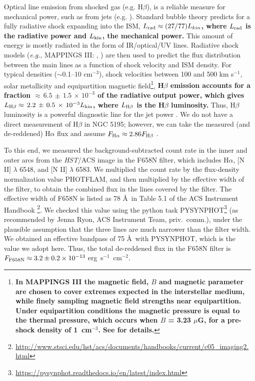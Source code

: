 \documentclass[fleqn,usenatbib]{mnras}
\begin{document}
Optical line emission from shocked gas (e.g. H$\beta$), is a reliable measure for mechanical power, 
such as from jets (e.g. \citealt{DopitaSutherland1996,Allenetal2008}). Standard bubble theory \citep{Weaver+1977} predicts for a fully radiative shock expanding into the ISM, \textbf{$L_{\rm rad} \approx (27/77)L_{kin}$, where  $L_{\rm rad}$ is the radiative power and $L_{\rm kin}$, the mechanical power.}
This amount of energy is mostly radiated in the form of IR/optical/UV lines. Radiative shock models ({\it e.g.}, 
{\small {MAPPINGS III}}: \citealt{DopitaSutherland1996}, \citealt{Allenetal2008}) are then used to 
predict the flux distribution between the main lines as a function of shock velocity and ISM density. 
For typical densities ($\sim$0.1--10 cm$^{-3}$), shock velocities between 100 and 500 km s$^{-1}$, 
solar metallicity and equipartition magnetic field\footnote{\textbf{In MAPPINGS III the magnetic field, $B$ and magnetic parameter are chosen to cover extremes expected in the interstellar medium, 
while finely sampling magnetic field strengths near equipartition. Under equipartition conditions the magnetic 
pressure is equal to the thermal pressure, which occurs when $B$ = 3.23 $\mu$G, for a pre-shock 
density of 1~cm$^{-3}$. See \citealt{Allenetal2008} for details.}}, \textbf{H$\beta$ emission accounts for a 
fraction $\approx\, 6.5\, \pm\, 1.5\, \times\, 10^{-3}$ of the radiative output power, which gives  $L_{\rm{H}\beta} \approx\, 2.2\, \pm\, 0.5\, \times\, 10^{-3} L_{\rm kin}$, where $L_{\rm{H}\beta}$ is the H$\beta$ luminosity.} Thus, H$\beta$ luminosity is a powerful diagnostic line for the 
jet power \citep{Pakull+2010}. We do not have a direct measurement of H$\beta$ in NGC 5195; however, 
we can take the measured (and de-reddened) H$\alpha$ flux and assume $F_{{\rm{H}}\alpha} \approx 
2.86F_{{\rm{H}}\beta}$ \citep{OF2006}.

To this end, we measured the background-subtracted count rate in the inner and outer arcs from the 
{\it HST}/ACS image in the F658N filter, which includes H$\alpha$, [N II] $\lambda$ 6548, and [N II] 
$\lambda$ 6583. We multiplied the count rate by the flux-density normalization value PHOTFLAM, and then 
multiplied by the effective width of the filter, to obtain the combined flux in the lines covered by 
the filter. The effective width of F658N is listed as 78 \AA\ in Table 5.1 of the ACS Instrument 
Handbook \footnote{\url{http://www.stsci.edu/hst/acs/documents/handbooks/current/c05_imaging2.html}}. We 
checked this value using the python task {\small{PYSYNPHOT}}\footnote{\url{https://pysynphot.readthedocs.io/en/latest/index.html}} (as recommended by Jenna Ryon, ACS Instrument Team, priv.~comm.), under the 
plausible assumption that the three lines are much narrower than the filter width. We obtained an 
effective bandpass of 75 \AA\ with {\small{PYSYNPHOT}}, which is the value we adopt here. Thus, the 
total de-reddened flux in the F658N filter is $F_{\rm{F658N}} \approx 3.2 \pm 0.2 \times 10^{-13}$ erg~s$^{-1}$~cm$^{-2}$.
\end{document}
